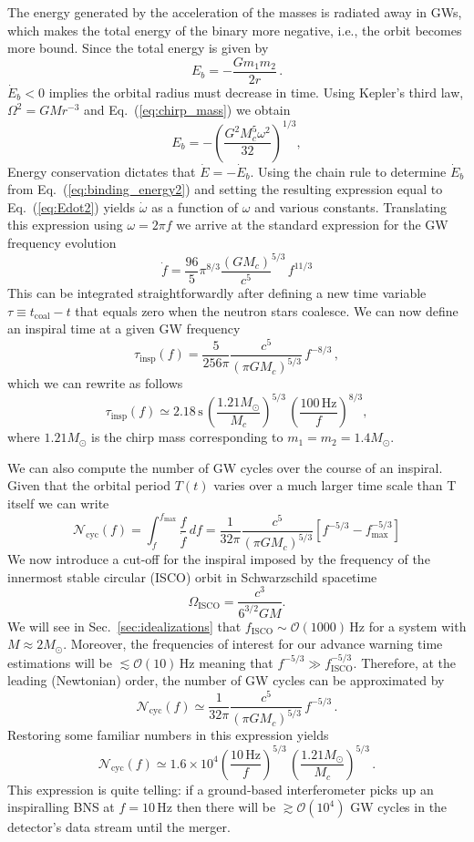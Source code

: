 \documentclass[11pt,a4paper]{article}
\newcommand{\f}{\frac}
\newcommand{\be}{\begin{equation}}
\newcommand{\ee}{\end{equation}}
\newcommand{\ord}{\mathcal{O}}
\begin{document}
The energy generated by the acceleration of the masses is radiated away in GWs,
which makes the total energy of the binary more negative, i.e., the orbit becomes more bound. 
Since the total energy is given by
%
\be
E_b = -\frac{G m_1 m_2}{2r}\, . \label{eq:binding_energy1}
\ee
%
$\dot{E}_b < 0$ implies the orbital radius must decrease in time. 
Using Kepler's third law, $ \Omega^2 = G M r^{-3}$ and Eq.~(\ref{eq:chirp_mass}) we obtain
%
\be
E_b = -\left(\f{G^2 M_c^5 \omega^2}{32}\right)^{1/3}, \label{eq:binding_energy2}
\ee
%
Energy conservation dictates that $\dot{E}=-\dot{E}_b$. Using the chain rule to determine $\dot{E}_b$ from Eq.~(\ref{eq:binding_energy2})
and setting the resulting expression equal to Eq.~(\ref{eq:Edot2}) yields $\dot{\omega}$ as a function of $\omega$ and various constants.
Translating this expression using $\omega=2\pi f$ we arrive at the standard expression for the GW frequency evolution
%
\be
\dot{f} = \f{96}{5}\pi^{8/3} \f{(G M_c)}{c^5}^{5/3}\, f^{11/3} \label{eq:fdot}
\ee
%
This can be integrated straightforwardly after defining a new time variable $\tau\equiv t_\text{coal}-t$ that equals zero when the neutron stars coalesce.
We can now define an inspiral time at a given GW frequency
%
\be
\tau_\text{insp}(f) = \f{5}{256\pi}\f{c^5}{(\pi G M_c)^{5/3}} \,f^{-8/3}\label{eq:tau_insp}\, ,
\ee
%
%
%
which we can rewrite as follows
%
\be
\tau_\text{insp}(f) \simeq 2.18\,\text{s} \, \left(\f{1.21 M_\odot}{M_c}\right)^{5/3}\,\left(\f{100\,\text{Hz}}{f}\right)^{8/3}, \label{eq:tau_insp2}
\ee
%
where $1.21 M_\odot$ is the chirp mass corresponding to $m_1=m_2=1.4 M_\odot$.

We can also compute the number of GW cycles over the course of an inspiral. Given that the orbital period $T(t)$ varies over a much larger time scale than T itself
we can write
%
\be
\mathcal{N}_\text{cyc}(f) = \int_f^{f_\text{max}} \f{f}{\dot{f}}\, df =\f{1}{32\pi} \f{c^5}{(\pi G M_c)^{5/3}}\left[ f^{-5/3}-f_\text{max}^{-5/3}\right] \label{eq:Ncyc1}
\ee
%
We now introduce a cut-off for the inspiral imposed by the frequency of the innermost stable circular (ISCO) orbit in Schwarzschild spacetime
\be
\Omega_\text{ISCO} = \f{c^3}{6^{3/2} G M} \label{eq:Sch_f_isco}.
\ee
%
%
We will see in Sec.~\ref{sec:idealizations} that $f_\text{ISCO} \sim \mathcal{O}(1000)\,$Hz for a system with $M\approx 2 M_\odot$. Moreover, the frequencies of interest for our advance warning time estimations will be $\lesssim \mathcal{O}(10)\,$Hz
meaning that $f^{-5/3} \gg f_\text{ISCO}^{-5/3}$. Therefore, at the leading (Newtonian) order, the number of GW cycles can be approximated by
%
\be
\mathcal{N}_\text{cyc}(f) \simeq \f{1}{32\pi} \f{c^5}{(\pi G M_c)^{5/3}}\, f^{-5/3} \, . \label{eq:Ncyc2}
\ee
%
Restoring some familiar numbers in this expression yields
%
\be
\mathcal{N}_\text{cyc}(f)\simeq 1.6\times 10^4 \left(\f{10\,\text{Hz}}{f} \right)^{5/3}\,\left(\f{1.21 M_\odot}{M_c}\right)^{5/3}\label{eq:Ncyc3}\, .
\ee
%
This expression is quite telling: if a ground-based interferometer picks up an
inspiralling BNS at $f=10\,$Hz then there will be $\gtrsim \ord(10^4)$ GW cycles in the detector's data stream until the merger.
\end{document}
